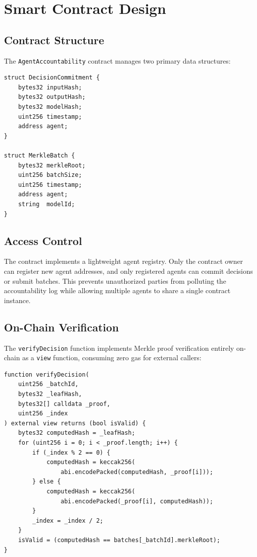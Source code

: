 \documentclass[manuscript,nonacm]{acmart}
\begin{document}
\section{Smart Contract Design}
\label{sec:contract}

\subsection{Contract Structure}

The \texttt{AgentAccountability} contract manages two primary data structures:

\begin{lstlisting}[caption={Core data structures},label={lst:structs}]
struct DecisionCommitment {
    bytes32 inputHash;
    bytes32 outputHash;
    bytes32 modelHash;
    uint256 timestamp;
    address agent;
}

struct MerkleBatch {
    bytes32 merkleRoot;
    uint256 batchSize;
    uint256 timestamp;
    address agent;
    string  modelId;
}
\end{lstlisting}

\subsection{Access Control}

The contract implements a lightweight agent registry. Only the contract owner can register new agent addresses, and only registered agents can commit decisions or submit batches. This prevents unauthorized parties from polluting the accountability log while allowing multiple agents to share a single contract instance.

\subsection{On-Chain Verification}

The \texttt{verifyDecision} function implements Merkle proof verification entirely on-chain as a \texttt{view} function, consuming zero gas for external callers:

\begin{lstlisting}[caption={On-chain Merkle proof verification},label={lst:verify}]
function verifyDecision(
    uint256 _batchId,
    bytes32 _leafHash,
    bytes32[] calldata _proof,
    uint256 _index
) external view returns (bool isValid) {
    bytes32 computedHash = _leafHash;
    for (uint256 i = 0; i < _proof.length; i++) {
        if (_index % 2 == 0) {
            computedHash = keccak256(
                abi.encodePacked(computedHash, _proof[i]));
        } else {
            computedHash = keccak256(
                abi.encodePacked(_proof[i], computedHash));
        }
        _index = _index / 2;
    }
    isValid = (computedHash == batches[_batchId].merkleRoot);
}
\end{lstlisting}
\end{document}
